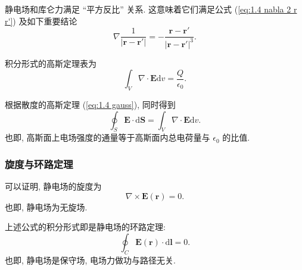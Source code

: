 静电场和库仑力满足 ``平方反比'' 关系. 这意味着它们满足公式 (\ref{eq:1.4 nabla 2 r r'}) 及如下重要结论
\begin{equation}
    \nabla\frac{1}{|\bm{r}-\bm{r}'|}=-\frac{\bm{r}-\bm{r}'}{|\bm{r}-\bm{r}'|^3}.
\end{equation}

积分形式的高斯定理表为
\begin{equation}
    \int_V\nabla\cdot\bm{E}\mathrm{d}v=\frac{Q}{\epsilon_0}.
\end{equation}

根据散度的高斯定理 (\ref{eq:1.4 gauss}), 同时得到
\begin{equation} \label{eq:2.1 gauss}
    \oint_S\bm{E}\cdot\mathrm{d}\bm{S}=\int_{V}\nabla\cdot\bm{E}\mathrm{d}v.
\end{equation}
也即, 高斯面上电场强度的通量等于高斯面内总电荷量与 $\epsilon_0$ 的比值.

\subsubsection{旋度与环路定理}
可以证明, 静电场的旋度为
\begin{equation} \label{eq:2.1 rot}
    \nabla\times\bm{E}(\bm{r})=0.
\end{equation}
也即, 静电场为无旋场.

上述公式的积分形式即是静电场的环路定理:
\begin{equation} \label{eq:2.1 rot int}
    \oint_C\bm{E}(\bm{r})\cdot\mathrm{d}\bm{l}=0.
\end{equation}
也即, 静电场是保守场, 电场力做功与路径无关.

